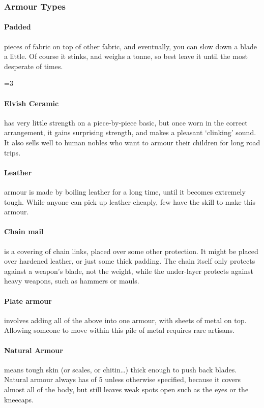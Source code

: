 \begin{multicols}{2}
\armourchart

\subsubsection{Armour Types}

\paragraph{Padded}
pieces of fabric on top of other fabric, and eventually, you can slow down a blade a little.
Of course it stinks, and weighs a tonne, so best leave it until the most desperate of times.

\ifnum\value{r4}=3
  \paragraph{Elvish Ceramic}
  has very little strength on a piece-by-piece basic, but once worn in the correct arrangement, it gains surprising strength, and makes a pleasant `clinking' sound.
  It also sells well to human nobles who want to armour their children for long road trips. 
\fi

\paragraph{Leather}
armour is made by boiling leather for a long time, until it becomes extremely tough.
While anyone can pick up leather cheaply, few have the skill to make this armour.

\paragraph{Chain mail}
is a covering of chain links, placed over some other protection.
It might be placed over hardened leather, or just some thick padding.
The chain itself only protects against a weapon's blade, not the weight, while the under-layer protects against heavy weapons, such as hammers or mauls.

\paragraph{Plate armour}
involves adding all of the above into one armour, with sheets of metal on top.
Allowing someone to move within this pile of metal requires rare artisans.


\paragraph{Natural Armour}
means tough skin (or scales, or chitin\ldots) thick enough to push back blades.
Natural armour always has  of 5 unless otherwise specified, because it covers almost all of the body, but still leaves weak spots open such as the eyes or the kneecaps.


\end{multicols}

